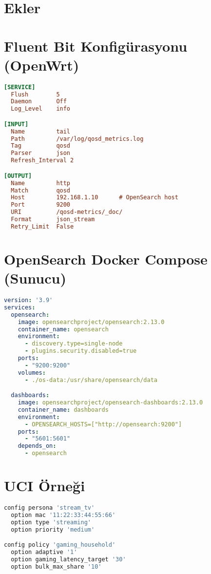 \documentclass[11pt,a4paper]{article}
\begin{document}
\appendix
\section*{Ekler}

\section{Fluent Bit Konfigürasyonu (OpenWrt)}
\begin{lstlisting}[language=ini,caption={/etc/fluent-bit.conf}]
[SERVICE]
  Flush        5
  Daemon       Off
  Log_Level    info

[INPUT]
  Name         tail
  Path         /var/log/qosd_metrics.log
  Tag          qosd
  Parser       json
  Refresh_Interval 2

[OUTPUT]
  Name         http
  Match        qosd
  Host         192.168.1.10      # OpenSearch host
  Port         9200
  URI          /qosd-metrics/_doc/
  Format       json_stream
  Retry_Limit  False
\end{lstlisting}

\section{OpenSearch Docker Compose (Sunucu)}
\begin{lstlisting}[language=yaml,caption={docker-compose.yml}]
version: '3.9'
services:
  opensearch:
    image: opensearchproject/opensearch:2.13.0
    container_name: opensearch
    environment:
      - discovery.type=single-node
      - plugins.security.disabled=true
    ports:
      - "9200:9200"
    volumes:
      - ./os-data:/usr/share/opensearch/data

  dashboards:
    image: opensearchproject/opensearch-dashboards:2.13.0
    container_name: dashboards
    environment:
      - OPENSEARCH_HOSTS=["http://opensearch:9200"]
    ports:
      - "5601:5601"
    depends_on:
      - opensearch
\end{lstlisting}

\section{UCI Örneği}
\begin{lstlisting}[language=bash]
config persona 'stream_tv'
  option mac '11:22:33:44:55:66'
  option type 'streaming'
  option priority 'medium'

config policy 'gaming_household'
  option adaptive '1'
  option gaming_latency_target '30'
  option bulk_max_share '10'
\end{lstlisting}
\end{document}
